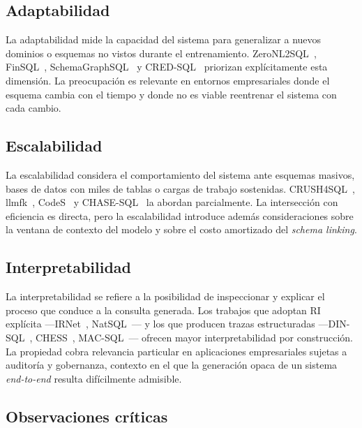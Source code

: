 \subsection{Adaptabilidad}
\label{subsec:sota-d6-adaptabilidad}

La adaptabilidad mide la capacidad del sistema para generalizar a
nuevos dominios o esquemas no vistos durante el entrenamiento.
ZeroNL2SQL~\cite{ZeroNL2SQL2024}, FinSQL~\cite{FinSQL2024},
SchemaGraphSQL~\cite{SchemaGraphSQL} y CRED-SQL~\cite{CRED-SQL2025}
priorizan explícitamente esta dimensión. La preocupación es relevante
en entornos empresariales donde el esquema cambia con el tiempo y donde
no es viable reentrenar el sistema con cada cambio.

\subsection{Escalabilidad}
\label{subsec:sota-d6-escalabilidad}

La escalabilidad considera el comportamiento del sistema ante esquemas
masivos, bases de datos con miles de tablas o cargas de trabajo
sostenidas. CRUSH4SQL~\cite{CRUSH4SQL2023}, llmfk~\cite{llmfk},
CodeS~\cite{CodeS2024} y CHASE-SQL~\cite{CHASE-SQL2025} la abordan
parcialmente. La intersección con eficiencia es directa, pero la
escalabilidad introduce además consideraciones sobre la ventana de
contexto del modelo y sobre el costo amortizado del \emph{schema
linking}.

\subsection{Interpretabilidad}
\label{subsec:sota-d6-interpretabilidad}

La interpretabilidad se refiere a la posibilidad de inspeccionar y
explicar el proceso que conduce a la consulta generada. Los trabajos
que adoptan RI explícita ---IRNet~\cite{IRNet},
NatSQL~\cite{gan2021natsql}--- y los que producen
trazas estructuradas ---DIN-SQL~\cite{DIN-SQL2023},
CHESS~\cite{CHESS2024}, MAC-SQL~\cite{MAC-SQL2023}--- ofrecen mayor
interpretabilidad por construcción. La propiedad cobra relevancia
particular en aplicaciones empresariales sujetas a auditoría y
gobernanza, contexto en el que la generación opaca de un sistema
\emph{end-to-end} resulta difícilmente admisible.

\subsection{Observaciones críticas}
\label{subsec:sota-d6-obs}

